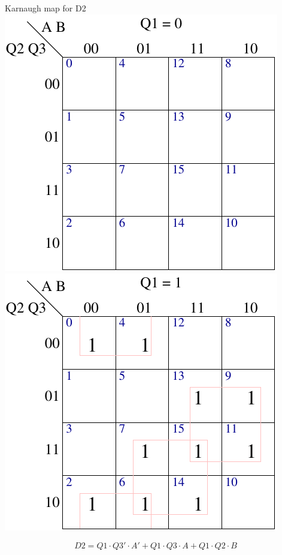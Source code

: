 \begin{frame}{Karnaugh map for D2}
  \includegraphics[scale=0.7]{D2Q1is0KMap}
  \includegraphics[scale=0.7]{D2Q1is1KMap}
\end{frame}

$$D2 = Q1 \cdot Q3' \cdot A' + Q1 \cdot Q3 \cdot A + Q1 \cdot Q2 \cdot B$$

